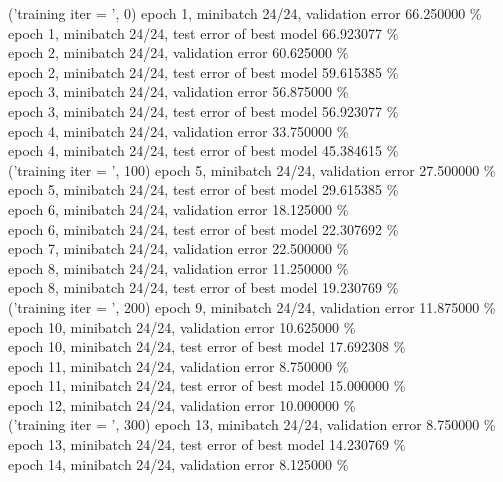 \documentclass[a4paper]{article}
\begin{document}
('training \@ iter = ', 0)
epoch 1, minibatch 24/24, validation error 66.250000 \% \\
     epoch 1, minibatch 24/24, test error of best model 66.923077 \% \\
epoch 2, minibatch 24/24, validation error 60.625000 \% \\
     epoch 2, minibatch 24/24, test error of best model 59.615385 \% \\
epoch 3, minibatch 24/24, validation error 56.875000 \% \\
     epoch 3, minibatch 24/24, test error of best model 56.923077 \% \\
epoch 4, minibatch 24/24, validation error 33.750000 \% \\
     epoch 4, minibatch 24/24, test error of best model 45.384615 \% \\
('training \@ iter = ', 100)
epoch 5, minibatch 24/24, validation error 27.500000 \% \\
     epoch 5, minibatch 24/24, test error of best model 29.615385 \% \\
epoch 6, minibatch 24/24, validation error 18.125000 \% \\
     epoch 6, minibatch 24/24, test error of best model 22.307692 \% \\
epoch 7, minibatch 24/24, validation error 22.500000 \% \\
epoch 8, minibatch 24/24, validation error 11.250000 \% \\
     epoch 8, minibatch 24/24, test error of best model 19.230769 \% \\
('training \@ iter = ', 200)
epoch 9, minibatch 24/24, validation error 11.875000 \% \\
epoch 10, minibatch 24/24, validation error 10.625000 \% \\
     epoch 10, minibatch 24/24, test error of best model 17.692308 \% \\
epoch 11, minibatch 24/24, validation error 8.750000 \% \\
     epoch 11, minibatch 24/24, test error of best model 15.000000 \% \\
epoch 12, minibatch 24/24, validation error 10.000000 \% \\
('training \@ iter = ', 300)
epoch 13, minibatch 24/24, validation error 8.750000 \% \\
     epoch 13, minibatch 24/24, test error of best model 14.230769 \% \\
epoch 14, minibatch 24/24, validation error 8.125000 \% \\
\end{document}
